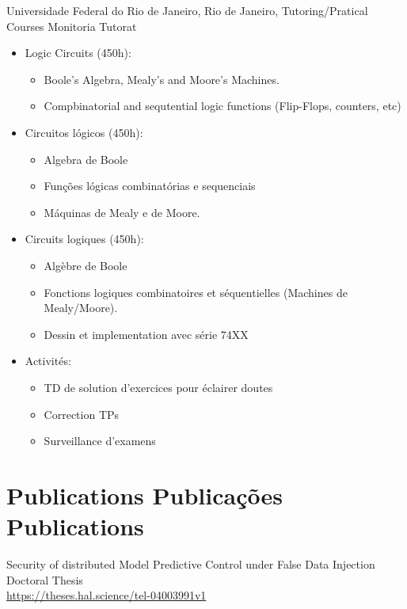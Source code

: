 {Universidade Federal do Rio de Janeiro, Rio de Janeiro, \brazil}
{\newline   \ml
  {Tutoring/Pratical Courses}
  {Monitoria}
  {Tutorat}
}
{}
{}
{
  \ml
  {
    \begin{itemize}
    \item Logic Circuits (450h):
      \begin{itemize}
      \item Boole's Algebra, Mealy's and Moore's Machines.
      \item Compbinatorial and sequtential logic functions (Flip-Flops, counters, etc)
      \end{itemize}
    \end{itemize}
  }
  {
    \begin{itemize}
    \item Circuitos lógicos (450h):
      \begin{itemize}
        \item Algebra de Boole
        \item Funções lógicas combinatórias e sequenciais
        \item Máquinas de Mealy e de Moore.
      \end{itemize}
    \end{itemize}
  }
  {
    \begin{itemize}
      \item Circuits logiques (450h):
      \begin{itemize}
        \item Algèbre de Boole
        \item Fonctions logiques combinatoires et séquentielles (Machines de Mealy/Moore).
        \item Dessin et implementation avec série 74XX
      \end{itemize}
    \end{itemize}
    \begin{itemize}
      \item Activités:
            \begin{itemize}
              \item TD de solution d'exercices pour éclairer doutes
              \item Correction TPs
              \item Surveillance d'examens
            \end{itemize}
    \end{itemize}
  }
}

\section{
  \ml
  {Publications}
  {Publicações}
  {Publications}
}
{Security of distributed Model Predictive Control under False Data Injection}
{}
{}{}{Doctoral Thesis\\\url{https://theses.hal.science/tel-04003991v1}}

